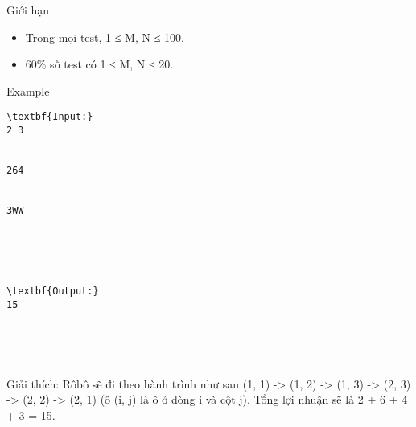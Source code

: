 Giới hạn
\begin{itemize}
	\item     Trong mọi test, 1 ≤ M, N ≤ 100.   
	\item     60\% số test có 1 ≤ M, N ≤ 20.   
\end{itemize}
Example
\begin{verbatim}
\textbf{Input:}
2 3


264


3WW





\textbf{Output:}
15





\end{verbatim}

Giải thích: Rôbô sẽ đi theo hành trình như sau (1, 1) -> (1, 2) -> (1, 3) -> (2, 3) -> (2, 2) -> (2, 1) (ô (i, j) là ô ở dòng i và cột j). Tổng lợi nhuận sẽ là 2 + 6 + 4 + 3 = 15.